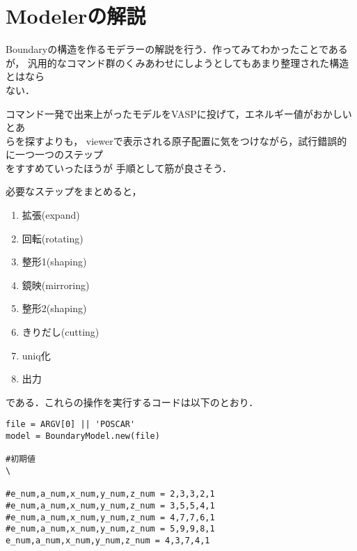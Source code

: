 
\section{Modelerの解説}
Boundaryの構造を作るモデラーの解説を行う．作ってみてわかったことであるが，
汎用的なコマンド群のくみあわせにしようとしてもあまり整理された構造とはなら\\
ない．

コマンド一発で出来上がったモデルをVASPに投げて，エネルギー値がおかしいとあ\\
らを探すよりも，
viewerで表示される原子配置に気をつけながら，試行錯誤的に一つ一つのステップ\\
をすすめていったほうが
手順として筋が良さそう．

必要なステップをまとめると，

\begin{enumerate}
\item 拡張(expand)
\item 回転(rotating)
\item 整形1(shaping)
\item 鏡映(mirroring)
\item 整形2(shaping)
\item きりだし(cutting)
\item uniq化
\item 出力
\end{enumerate}
である．これらの操作を実行するコードは以下のとおり．
\begin{lstlisting}[style=customRuby]
file = ARGV[0] || 'POSCAR'
model = BoundaryModel.new(file)

#初期値                                                                    \

#e_num,a_num,x_num,y_num,z_num = 2,3,3,2,1
#e_num,a_num,x_num,y_num,z_num = 3,5,5,4,1
#e_num,a_num,x_num,y_num,z_num = 4,7,7,6,1
#e_num,a_num,x_num,y_num,z_num = 5,9,9,8,1
e_num,a_num,x_num,y_num,z_num = 4,3,7,4,1
\end{lstlisting}

